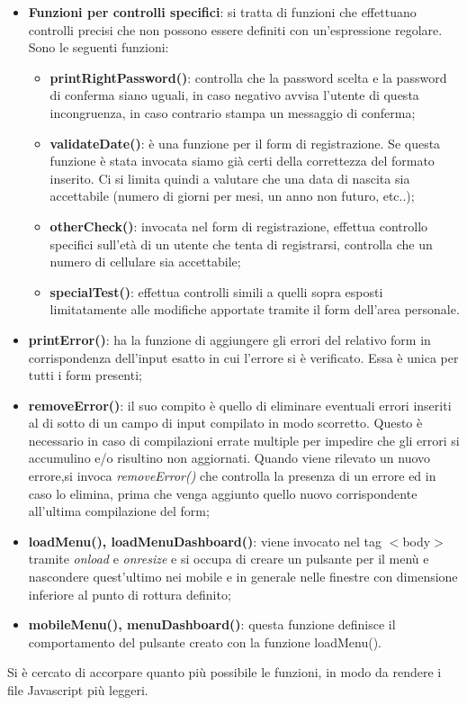 \begin{itemize}
    \item \textbf{Funzioni per controlli specifici}: si tratta di funzioni che effettuano controlli precisi che non possono essere definiti con un'espressione regolare. Sono le seguenti funzioni:
    \begin{itemize}
        \item \textbf{printRightPassword()}: controlla che la password scelta e la password di conferma siano uguali, in caso negativo avvisa l'utente di questa incongruenza, in caso contrario stampa un messaggio di conferma;
        \item \textbf{validateDate()}: è una funzione per il form di registrazione. Se questa funzione è stata invocata siamo già certi della correttezza del formato inserito. Ci si limita quindi a valutare che una data di nascita sia accettabile (numero di giorni per mesi, un anno non futuro, etc..);
        \item \textbf{otherCheck()}: invocata nel form di registrazione, effettua controllo specifici sull'età di un utente che tenta di registrarsi, controlla che un numero di cellulare sia accettabile;
        \item \textbf{specialTest()}: effettua controlli simili a quelli sopra esposti limitatamente alle modifiche apportate tramite il form dell'area personale.
    \end{itemize}
    
    \item \textbf{printError()}: ha la funzione di aggiungere gli errori del relativo form in corrispondenza dell'input esatto in cui l'errore si è verificato. Essa è unica per tutti i form presenti;
    
    \item \textbf{removeError()}: il suo compito è quello di eliminare eventuali errori inseriti al di sotto di un campo di input compilato in modo scorretto. Questo è necessario in caso di compilazioni errate multiple per impedire che gli errori si accumulino e/o risultino non aggiornati. Quando viene rilevato un nuovo errore,si invoca \textit{removeError()} che controlla la presenza di un errore ed in caso lo elimina, prima che venga aggiunto quello nuovo corrispondente all'ultima compilazione del form;
    
    \item \textbf{loadMenu(), loadMenuDashboard()}: viene invocato nel tag $<$body$>$ tramite \textit{onload} e \textit{onresize} e si occupa di creare un pulsante per il menù e nascondere quest'ultimo nei mobile e in generale nelle finestre con dimensione inferiore al punto di rottura definito;
    
    \item \textbf{mobileMenu(), menuDashboard()}: questa funzione definisce il comportamento del pulsante creato con la funzione loadMenu().
    
\end{itemize}
Si è cercato di accorpare quanto più possibile le funzioni, in modo da rendere i file Javascript più leggeri.

